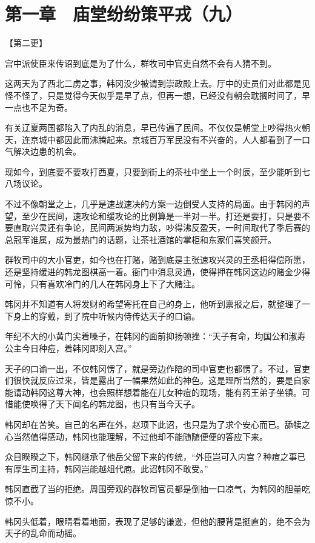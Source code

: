 \section{第一章　庙堂纷纷策平戎（九）}

【第二更】

宫中派使臣来传诏到底是为了什么，群牧司中官吏自然不会有人猜不到。

这两天为了西北二虏之事，韩冈没少被请到崇政殿上去。厅中的吏员们对此都是见怪不怪了，只是觉得今天似乎是早了点，但再一想，已经没有朝会耽搁时间了，早一点也不足为奇。

有关辽夏两国都陷入了内乱的消息，早已传遍了民间。不仅仅是朝堂上吵得热火朝天，连京城中都因此而沸腾起来。京城百万军民没有不兴奋的，人人都看到了一口气解决边患的机会。

现如今，到底要不要攻打西夏，只要到街上的茶社中坐上一个时辰，至少能听到七八场议论。

不过不像朝堂之上，几乎是速战速决的方案一边倒受人支持的局面。由于韩冈的声望，至少在民间，速攻论和缓攻论的比例算是一半对一半。打还是要打，只是要不要直取兴灵还有争论，民间两派势均力敌，吵得沸反盈天，一时间取代了季后赛的总冠军谁属，成为最热门的话题，让茶社酒馆的掌柜和东家们喜笑颜开。

群牧司中的大小官吏，如今也在打赌，赌到底是主张速攻兴灵的王丞相得偿所愿，还是坚持缓进的韩龙图棋高一着。衙门中消息灵通，使得押在韩冈这边的赌金少得可怜，只有喜欢冷门的几人在韩冈身上下了大赌注。

韩冈并不知道有人将发财的希望寄托在自己的身上，他听到禀报之后，就整理了一下身上的穿戴，到了院中听候内侍传达天子的口谕。

年纪不大的小黄门尖着嗓子，在韩冈的面前抑扬顿挫：“天子有命，均国公和淑寿公主今日种痘，着韩冈即刻入宫。”

天子的口谕一出，不仅韩冈愣了，就是旁边作陪的司中官吏也都愣了。不过，官吏们很快就反应过来，皆是露出了一幅果然如此的神色。这是理所当然的，要是自家能请动韩冈这尊大神，也会照样想着能在儿女种痘的现场，能有药王弟子坐镇。可惜能使唤得了天下闻名的韩龙图，也只有当今天子。

韩冈却在苦笑。自己的名声在外，赵顼下此诏，也只是为了求个安心而已。舔犊之心当然值得感动，韩冈也能理解，不过他却不能随随便便的答应下来。

众目睽睽之下，韩冈继承了他岳父留下来的传统，“外臣岂可入内宫？种痘之事已有厚生司主持，韩冈岂能越俎代庖。此诏韩冈不敢受。”

韩冈直截了当的拒绝。周围旁观的群牧司官员都是倒抽一口凉气，为韩冈的胆量吃惊不小。

韩冈头低着，眼睛看着地面，表现了足够的谦逊，但他的腰背是挺直的，绝不会为天子的乱命而动摇。

